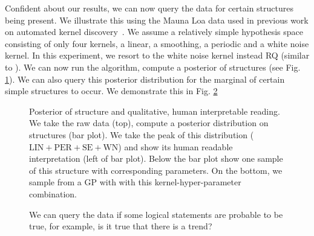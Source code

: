 Confident about our results, we can now query the data for certain structures being present. We illustrate this using the Mauna Loa data used in previous work on automated kernel discovery~\citep{duvenaud2013structure}. We assume a relatively simple hypothesis space  consisting of only four kernels, a linear, a smoothing, a periodic and a white noise kernel. In this experiment, we resort to the white noise kernel instead RQ (similar to \citep{lloyd2014automatic}).  We can now run the algorithm, compute a posterior of structures (see Fig. \ref{fig:posterior}). We can also query this posterior distribution for the marginal of certain simple structures to occur. We demonstrate this in Fig. \ref{fig:query}
\begin{figure}
\centering

\caption{Posterior of structure and qualitative, human interpretable reading. We take the raw data (top), compute a posterior distribution on structures (bar plot). We take the peak of this distribution ($\text{LIN}+\text{PER}+\text{SE}+\text{WN}$) and show its human readable interpretation (left of bar plot). Below the bar plot show one sample of this structure with corresponding parameters. On the bottom, we sample from a \ac{GP} with with this kernel-hyper-parameter combination.}\label{fig:posterior}
\end{figure}
\begin{figure}
\centering

\caption{We can query the data if some logical statements are probable to be true, for example, is it true that there is a trend?}\label{fig:query}
\end{figure}